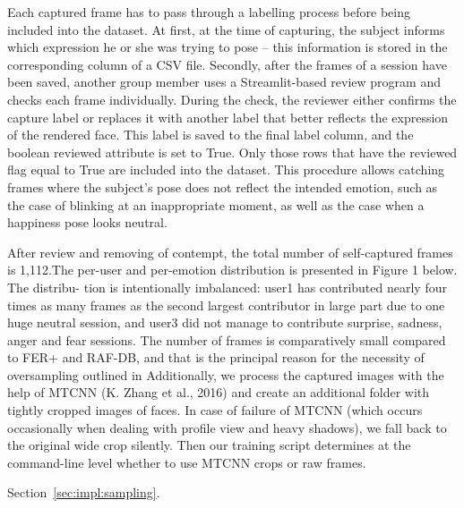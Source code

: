 \documentclass[12pt,a4paper]{article}
\begin{document}
Each captured frame has to pass through a labelling process before being included into
the dataset. At first, at the time of capturing, the subject informs which expression he or she was trying to pose – this information is stored in the corresponding column of a CSV file. Secondly, after the frames of a session have been saved, another group member uses a Streamlit-based review program and checks each frame individually. During the check, the reviewer either confirms the capture label or replaces it with another label that better reflects the expression of the rendered face. This label is saved to the final label column, and the boolean reviewed attribute is set to True. Only those rows that have the reviewed flag equal to True are included into the dataset. This procedure allows catching frames where the subject’s pose does not reflect the intended emotion, such as the case of blinking at an inappropriate moment, as well as the case when a happiness pose looks neutral.


After review and removing of contempt, the total number of self-captured frames is 1,112.The per-user and per-emotion distribution is presented in Figure 1 below. The distribu-
tion is intentionally imbalanced: user1 has contributed nearly four times as many frames as
the second largest contributor in large part due to one huge neutral session, and user3 did
not manage to contribute surprise, sadness, anger and fear sessions. The number of frames
is comparatively small compared to FER+ and RAF-DB, and that is the principal reason for
the necessity of oversampling outlined in Additionally, we process the captured images with the help of MTCNN (K. Zhang et al., 2016) and create an additional folder with tightly cropped images of faces. In case of failure of MTCNN (which occurs occasionally when dealing with profile view and heavy shadows), we fall back to the original wide crop silently. Then our training script determines at the command-line level whether to use MTCNN crops or raw frames.

Section~\ref{sec:impl:sampling}.
\end{document}

